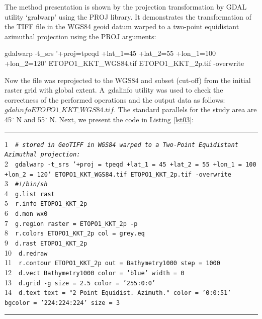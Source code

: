 \documentclass[technologies,article,accept,pdftex,moreauthors]{Definitions/mdpi}
\begin{document}
The method presentation is shown by the projection transformation by GDAL utility ‘gralwarp’ using the PROJ library. It demonstrates the transformation of the TIFF file in the WGS84 geoid datum warped to a two-point equidistant azimuthal projection using the PROJ arguments: 

\begin{spverbatim}
gdalwarp -t_srs '+proj=tpeqd +lat_1=45 +lat_2=55 +lon_1=100 +lon_2=120' 
ETOPO1_KKT_WGS84.tif ETOPO1_KKT_2p.tif -overwrite
\end{spverbatim}

Now the file was reprojected to the WGS84 and subset (cut-off) from the initial raster grid with global extent. A~gdalinfo utility was used to check the correctness of the performed operations and the output data as follows: $gdalinfo ETOPO1\_KKT\_WGS84.tif.$ {The standard parallels for the study area are }45$^{\circ}$ N and 55$^{\circ}${ N. }Next, we present the code in Listing \ref{lst03}:

\begin{listing}[H]
\caption{GRASS GIS %
 script for plotting two-point equidistant azimuthal projection.}\label{lst03}
\rule{\columnwidth}{1pt}
\raggedright
1~~\texttt{\emph{\# stored in GeoTIFF in WGS84 warped to a Two-Point Equidistant Azimuthal projection:\\}}
2~~\texttt{gdalwarp -t\_srs '+proj = tpeqd +lat\_1 = 45 +lat\_2 = 55 +lon\_1 = 100 +lon\_2 = 120' ETOPO1\_KKT\_WGS84.tif ETOPO1\_KKT\_2p.tif -overwrite\\}
3~~\texttt{\emph{\#!/bin/sh\\}}
4~~\texttt{g.list rast\\}
5~~\texttt{r.info ETOPO1\_KKT\_2p\\}
6~~\texttt{d.mon wx0\\}
7~~\texttt{g.region raster = ETOPO1\_KKT\_2p -p\\}
8~~\texttt{r.colors ETOPO1\_KKT\_2p col = grey.eq\\}
9~~\texttt{d.rast ETOPO1\_KKT\_2p\\}
10~~\texttt{d.redraw\\}
11~~\texttt{r.contour ETOPO1\_KKT\_2p out = Bathymetry1000 step = 1000\\}
12~~\texttt{d.vect Bathymetry1000 color = 'blue' width = 0\\}
13~~\texttt{d.grid -g size = 2.5 color = '255:0:0'\\}
14~~\texttt{d.text text = "2 Point Equidist. Azimuth." color = '0:0:51' bgcolor = '224:224:224' size = 3\\}
\rule{\columnwidth}{1pt}
\end{listing}
\end{document}
